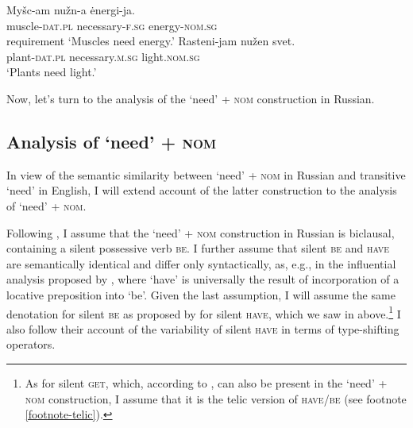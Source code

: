 \documentclass[output=paper,colorlinks,citecolor=brown]{langscibook}
\begin{document}
\ea \ea \label{nuzhen-muscles}\gll Myšc-am nužn-a ėnergi-ja. \\
muscle-\textsc{dat.pl} necessary-\textsc{f.sg} energy-\textsc{nom.sg}\\ \hfill requirement
\glt `Muscles need energy.'
\ex \label{nuzhen-plants}\gll Rasteni-jam nužen svet.\\
plant-\textsc{dat.pl} necessary.\textsc{m.sg} light.\textsc{nom.sg}\\
\glt `Plants need light.'
\z\z

\noindent Now, let's turn to the analysis of the `need' + \textsc{nom} construction in Russian.

\subsection{Analysis of `need' + \textsc{nom}\label{section-nom-analysis}}

In view of the semantic similarity between `need' + \textsc{nom} in Russian and transitive `need' in English, I will extend  account of the latter construction to the analysis of `need' + \textsc{nom}.

Following \citet{Harves2008}, I assume that the `need' + \textsc{nom} construction in Russian is biclausal, containing a silent possessive verb \textsc{be}. I further assume that silent \textsc{be} and \textsc{have} are semantically identical and differ only syntactically, as, e.g., in the influential analysis proposed by \citet{Freeze1992}, where `have' is universally the result of incorporation of a locative preposition into `be'. Given the last assumption, I will assume the same denotation for silent \textsc{be} as proposed by \citet{Zaroukian.Beller2013} for silent \textsc{have}, which we saw in  above.\footnote{As for silent \textsc{get}, which, according to \citet{Harves2008}, can also be present in the `need' + \textsc{nom} construction, I assume that it is the telic version of \textsc{have}/\textsc{be} (see footnote \ref{footnote-telic}).} I also follow their account of the variability of silent \textsc{have} in terms of type-shifting operators.
\end{document}
